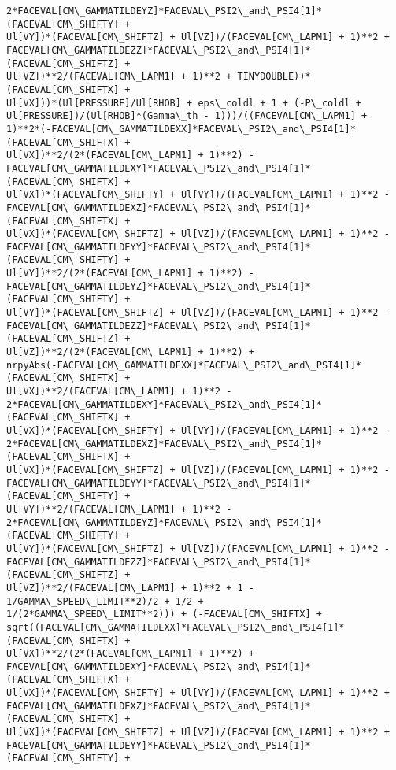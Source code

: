 \documentclass[landscape,letterpaper,10pt,english]{article}
\begin{document}
\begin{Verbatim}[commandchars=\\\{\}]
2*FACEVAL[CM\_GAMMATILDEYZ]*FACEVAL\_PSI2\_and\_PSI4[1]*(FACEVAL[CM\_SHIFTY] +
Ul[VY])*(FACEVAL[CM\_SHIFTZ] + Ul[VZ])/(FACEVAL[CM\_LAPM1] + 1)**2 +
FACEVAL[CM\_GAMMATILDEZZ]*FACEVAL\_PSI2\_and\_PSI4[1]*(FACEVAL[CM\_SHIFTZ] +
Ul[VZ])**2/(FACEVAL[CM\_LAPM1] + 1)**2 + TINYDOUBLE))*(FACEVAL[CM\_SHIFTX] +
Ul[VX]))*(Ul[PRESSURE]/Ul[RHOB] + eps\_coldl + 1 + (-P\_coldl +
Ul[PRESSURE])/(Ul[RHOB]*(Gamma\_th - 1)))/((FACEVAL[CM\_LAPM1] +
1)**2*(-FACEVAL[CM\_GAMMATILDEXX]*FACEVAL\_PSI2\_and\_PSI4[1]*(FACEVAL[CM\_SHIFTX] +
Ul[VX])**2/(2*(FACEVAL[CM\_LAPM1] + 1)**2) -
FACEVAL[CM\_GAMMATILDEXY]*FACEVAL\_PSI2\_and\_PSI4[1]*(FACEVAL[CM\_SHIFTX] +
Ul[VX])*(FACEVAL[CM\_SHIFTY] + Ul[VY])/(FACEVAL[CM\_LAPM1] + 1)**2 -
FACEVAL[CM\_GAMMATILDEXZ]*FACEVAL\_PSI2\_and\_PSI4[1]*(FACEVAL[CM\_SHIFTX] +
Ul[VX])*(FACEVAL[CM\_SHIFTZ] + Ul[VZ])/(FACEVAL[CM\_LAPM1] + 1)**2 -
FACEVAL[CM\_GAMMATILDEYY]*FACEVAL\_PSI2\_and\_PSI4[1]*(FACEVAL[CM\_SHIFTY] +
Ul[VY])**2/(2*(FACEVAL[CM\_LAPM1] + 1)**2) -
FACEVAL[CM\_GAMMATILDEYZ]*FACEVAL\_PSI2\_and\_PSI4[1]*(FACEVAL[CM\_SHIFTY] +
Ul[VY])*(FACEVAL[CM\_SHIFTZ] + Ul[VZ])/(FACEVAL[CM\_LAPM1] + 1)**2 -
FACEVAL[CM\_GAMMATILDEZZ]*FACEVAL\_PSI2\_and\_PSI4[1]*(FACEVAL[CM\_SHIFTZ] +
Ul[VZ])**2/(2*(FACEVAL[CM\_LAPM1] + 1)**2) +
nrpyAbs(-FACEVAL[CM\_GAMMATILDEXX]*FACEVAL\_PSI2\_and\_PSI4[1]*(FACEVAL[CM\_SHIFTX] +
Ul[VX])**2/(FACEVAL[CM\_LAPM1] + 1)**2 -
2*FACEVAL[CM\_GAMMATILDEXY]*FACEVAL\_PSI2\_and\_PSI4[1]*(FACEVAL[CM\_SHIFTX] +
Ul[VX])*(FACEVAL[CM\_SHIFTY] + Ul[VY])/(FACEVAL[CM\_LAPM1] + 1)**2 -
2*FACEVAL[CM\_GAMMATILDEXZ]*FACEVAL\_PSI2\_and\_PSI4[1]*(FACEVAL[CM\_SHIFTX] +
Ul[VX])*(FACEVAL[CM\_SHIFTZ] + Ul[VZ])/(FACEVAL[CM\_LAPM1] + 1)**2 -
FACEVAL[CM\_GAMMATILDEYY]*FACEVAL\_PSI2\_and\_PSI4[1]*(FACEVAL[CM\_SHIFTY] +
Ul[VY])**2/(FACEVAL[CM\_LAPM1] + 1)**2 -
2*FACEVAL[CM\_GAMMATILDEYZ]*FACEVAL\_PSI2\_and\_PSI4[1]*(FACEVAL[CM\_SHIFTY] +
Ul[VY])*(FACEVAL[CM\_SHIFTZ] + Ul[VZ])/(FACEVAL[CM\_LAPM1] + 1)**2 -
FACEVAL[CM\_GAMMATILDEZZ]*FACEVAL\_PSI2\_and\_PSI4[1]*(FACEVAL[CM\_SHIFTZ] +
Ul[VZ])**2/(FACEVAL[CM\_LAPM1] + 1)**2 + 1 - 1/GAMMA\_SPEED\_LIMIT**2)/2 + 1/2 +
1/(2*GAMMA\_SPEED\_LIMIT**2))) + (-FACEVAL[CM\_SHIFTX] +
sqrt((FACEVAL[CM\_GAMMATILDEXX]*FACEVAL\_PSI2\_and\_PSI4[1]*(FACEVAL[CM\_SHIFTX] +
Ul[VX])**2/(2*(FACEVAL[CM\_LAPM1] + 1)**2) +
FACEVAL[CM\_GAMMATILDEXY]*FACEVAL\_PSI2\_and\_PSI4[1]*(FACEVAL[CM\_SHIFTX] +
Ul[VX])*(FACEVAL[CM\_SHIFTY] + Ul[VY])/(FACEVAL[CM\_LAPM1] + 1)**2 +
FACEVAL[CM\_GAMMATILDEXZ]*FACEVAL\_PSI2\_and\_PSI4[1]*(FACEVAL[CM\_SHIFTX] +
Ul[VX])*(FACEVAL[CM\_SHIFTZ] + Ul[VZ])/(FACEVAL[CM\_LAPM1] + 1)**2 +
FACEVAL[CM\_GAMMATILDEYY]*FACEVAL\_PSI2\_and\_PSI4[1]*(FACEVAL[CM\_SHIFTY] +

\end{Verbatim}
\end{document}
